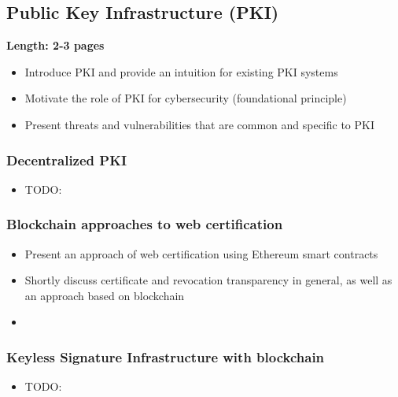 \subsection{Public Key Infrastructure (PKI)}

\textbf{Length: 2-3 pages}

\begin{itemize}
  \item Introduce PKI and provide an intuition for existing PKI systems
  \item Motivate the role of PKI for cybersecurity (foundational principle)
  \item Present threats and vulnerabilities that are common and specific to PKI
\end{itemize}

\subsubsection{Decentralized PKI}

\begin{itemize}
  \item TODO:
\end{itemize}

\subsubsection{Blockchain approaches to web certification}

\begin{itemize}
  \item Present an approach of web certification using Ethereum smart contracts
  \item Shortly discuss certificate and revocation transparency in general, as well as an approach based on blockchain
  \item
\end{itemize}

\subsubsection{Keyless Signature Infrastructure with blockchain}

\begin{itemize}
  \item TODO:
\end{itemize}

